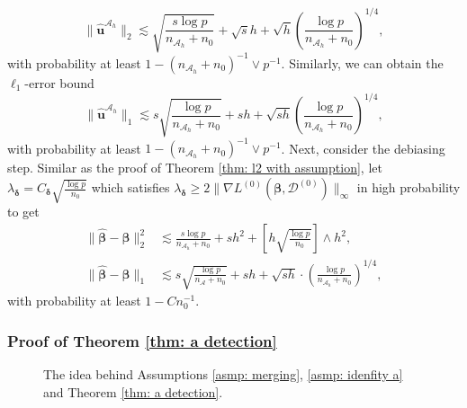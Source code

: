 \documentclass[12pt]{article}
\newcommand{\bdelta}{\bm{\delta}}
\newcommand{\infnorm}[1]{\|#1\|_{\infty}}
\newcommand{\twonorm}[1]{\|#1\|_{2}}
\newcommand{\onenorm}[1]{\|#1\|_{1}}
\newcommand{\bbeta}{\bm{\beta}}
\newcommand{\hbeta}{\hat{\bm{\beta}}}
\newcommand{\bbetak}[1]{\bm{\beta}^{(#1)}}
\newcommand{\huah}{\hat{\bm{u}}^{\mathcal{A}_h}}
\newcommand{\md}{\mathcal{D}}
\newcommand{\na}{n_{\mathcal{A}}}
\newcommand{\nah}{n_{\mathcal{A}_h}}
\newcommand{\<}{\langle}
\renewcommand{\>}{\rangle}
\begin{document}
	\begin{equation}\label{eq: detection cite}
		\twonorm{\huah} \lesssim \sqrt{\frac{s\log p}{\nah+n_0}} + \sqrt{s}h + \sqrt{h}\left(\frac{\log p}{\nah+n_0}\right)^{1/4},
	\end{equation}
	with probability at least $1-(\nah+n_0)^{-1}\vee p^{-1}$. Similarly, we can obtain the $\ell_1$-error bound
	\begin{equation}
		\onenorm{\huah} \lesssim s\sqrt{\frac{\log p}{\nah+n_0}} + sh + \sqrt{sh}\left(\frac{\log p}{\nah+n_0}\right)^{1/4},\label{eq: ua l1 bound without assumption}
	\end{equation}
	with probability at least $1-(\nah+n_0)^{-1}\vee p^{-1}$. Next, consider the debiasing step. Similar as the proof of Theorem \ref{thm: l2 with assumption}, let $\lambda_{\bdelta} =  C_{\bdelta}\sqrt{\frac{\log p}{n_0}}$ which satisfies $\lambda_{\bdelta} \geq 2\infnorm{\nabla L^{(0)}(\bbeta, \md^{(0)})}$ in high probability to get
		\begin{align}
			\twonorm{\hbeta - \bbeta}^2 &\lesssim \frac{s\log p}{\nah+n_0} + sh^2 + \left[h\sqrt{\frac{\log p}{n_0}}\right] \wedge h^2, \\
			\onenorm{\hbeta - \bbeta} &\lesssim s\sqrt{\frac{\log p}{\na+n_0}} + sh + \sqrt{sh}\cdot \left(\frac{\log p}{\nah+n_0}\right)^{1/4},
		\end{align}
	with probability at least $1-Cn_0^{-1}$. 


\subsubsection{Proof of Theorem \ref{thm: a detection}}


\begin{figure}[!h]
\centering
{}
\caption{The idea behind Assumptions \ref{asmp: merging}, \ref{asmp: idenfity a} and Theorem \ref{thm: a detection}.}
\label{fig: decomp}
\end{figure}
\end{document}
